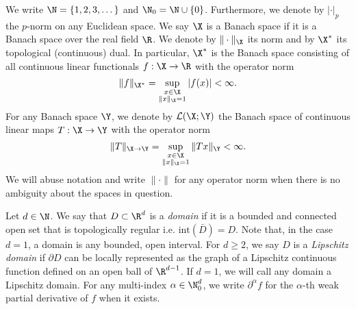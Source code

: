 We write \(\N= \{1,2,3,\dots\}\) and \(\N_0 = \N \cup \{0\}\). Furthermore, we denote by \(|\cdot|_p\) the \(p\)-norm on any Euclidean space. We say \(\X\) is a Banach space if it is a Banach space over the real field \(\R\). 
We denote by \(\|\cdot\|_\X\) its norm and by \(\X^*\) its topological (continuous) dual.
In particular, \(\X^*\) is the Banach space consisting  of all continuous linear functionals 
\(f : \X \to \R\) with the operator norm
\[\|f\|_{\X^*} = \sup_{\substack{x \in \X \\ \|x\|_\X = 1}} |f(x)| < \infty.\]
For any Banach space \(\Y\), we denote by \(\mathcal{L}(\X;\Y)\) the Banach space of continuous 
linear maps \(T : \X \to \Y\) with the operator norm
\[\|T\|_{\X \to \Y} = \sup_{\substack{x \in \X \\ \|x\|_\X = 1}} \|Tx\|_\Y < \infty.\]
We will abuse notation and write \(\|\cdot\|\) for any operator norm when there is no ambiguity about the
spaces in question.

Let \(d \in \N\). We say that \(D \subset \R^d\) is a \textit{domain} if it is a bounded and connected open set that is topologically regular i.e. \(\text{int}(\bar{D}) = D\).
Note that, in the case \(d = 1\), a domain is any bounded, open interval. For \(d \geq 2\),
we say \(D\) is a \textit{Lipschitz domain} if \(\partial D\) can be locally represented as the graph of 
a Lipschitz continuous function defined on an open ball of \(\R^{d-1}\). If \(d=1\), we will call 
any domain a Lipschitz domain. For any multi-index \(\alpha \in \N_0^d\), we write \(\partial^\alpha f \) for the \(\alpha\)-th weak partial derivative of \(f\) when it exists. 

